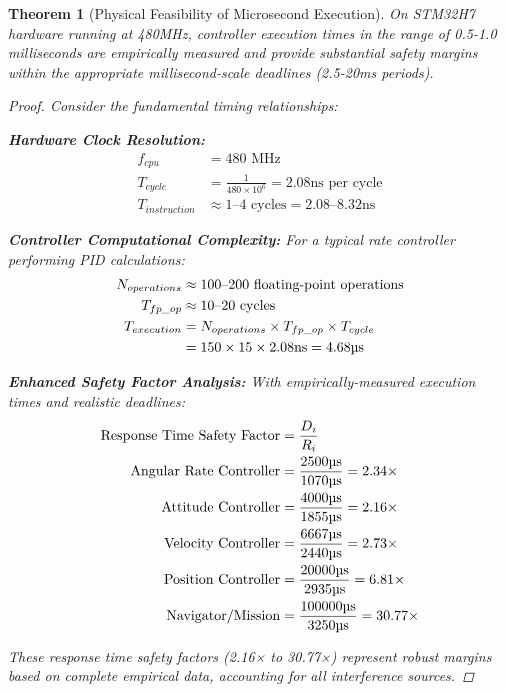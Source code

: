 \documentclass[11pt,a4paper]{article}
\newtheorem{theorem}{Theorem}[section]
\theoremstyle{definition}
\theoremstyle{remark}
\begin{document}
\begin{theorem}[Physical Feasibility of Microsecond Execution]
On STM32H7 hardware running at 480MHz, controller execution times in the range of 0.5-1.0 milliseconds are empirically measured and provide substantial safety margins within the appropriate millisecond-scale deadlines (2.5-20ms periods).

\begin{proof}
Consider the fundamental timing relationships:

\textbf{Hardware Clock Resolution:}
\begin{align}
f_{cpu} &= 480 \text{ MHz} \\
T_{cycle} &= \frac{1}{480 \times 10^6} = 2.08\text{ns per cycle} \\
T_{instruction} &\approx 1\text{--}4 \text{ cycles} = 2.08\text{--}8.32\text{ns}
\end{align}

\textbf{Controller Computational Complexity:}
For a typical rate controller performing PID calculations:
\begin{align}
N_{operations} &\approx 100\text{--}200 \text{ floating-point operations} \\
T_{fp\_op} &\approx 10\text{--}20 \text{ cycles} \\
T_{execution} &= N_{operations} \times T_{fp\_op} \times T_{cycle} \\
&= 150 \times 15 \times 2.08\text{ns} = 4.68\text{\textmu s}
\end{align}

\textbf{Enhanced Safety Factor Analysis:}
With empirically-measured execution times and realistic deadlines:
\begin{align}
\text{Response Time Safety Factor} &= \frac{D_i}{R_i} \\
\text{Angular Rate Controller} &= \frac{2500\text{\textmu s}}{1070\text{\textmu s}} = 2.34\times \\
\text{Attitude Controller} &= \frac{4000\text{\textmu s}}{1855\text{\textmu s}} = 2.16\times \\
\text{Velocity Controller} &= \frac{6667\text{\textmu s}}{2440\text{\textmu s}} = 2.73\times \\
\text{Position Controller} &= \frac{20000\text{\textmu s}}{2935\text{\textmu s}} = 6.81\times \\
\text{Navigator/Mission} &= \frac{100000\text{\textmu s}}{3250\text{\textmu s}} = 30.77\times
\end{align}

These response time safety factors (2.16× to 30.77×) represent robust margins based on complete empirical data, accounting for all interference sources.
\end{proof}
\end{theorem}
\end{document}
